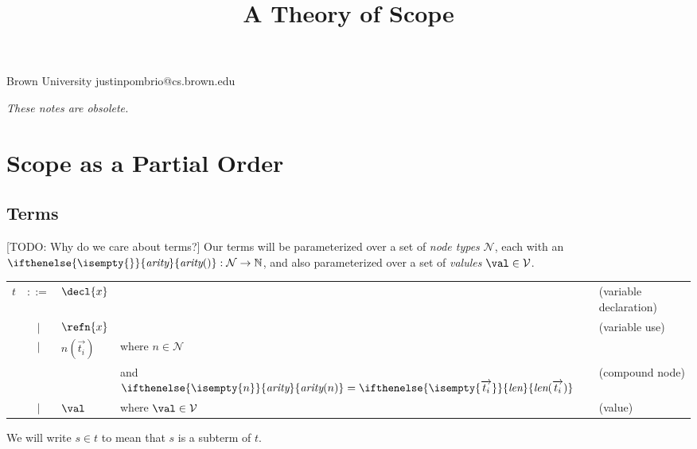 \documentclass[preprint]{sigplanconf}
\makeatletter
\newenvironment{jtable}
  {\begin{center}\begin{tabular}{l c l @{\quad}l l}}
  {\end{tabular}\end{center}}
\theoremstyle{plain}
\newcommand{\ifempty}[3]{\ifthenelse{\isempty{#1}}{#2}{#3}}
\newcommand{\constr}[2]{\ifempty{#2}{#1}{#1(#2)}}
\newcommand{\constrit}[2]{\constr{\textit{#1}}{#2}}
\newcommand{\node}[2]{#1(#2)}
\newcommand{\arity}[1]{\constrit{arity}{#1}}
\newcommand{\len}[1]{\constrit{len}{#1}}
\newcommand{\seq}[1]{\overrightarrow{#1}}
\makeatother
\begin{document}
\title{A Theory of Scope}
  {Brown University}
  {justinpombrio@cs.brown.edu}
\maketitle

\emph{These notes are obsolete.}



\section{Scope as a Partial Order}

\subsection{Terms}

[TODO: Why do we care about terms?]
Our terms will be parameterized over a set of \emph{node types}
$\mathcal{N}$, each with an
$\arity{} : \mathcal{N} \to \mathbb{N}$, and also parameterized over a
set of \emph{valules} $\val \in \mathcal{V}$.

\begin{jtable}
$t$ &$::=$& $\decl{x}$ && (variable declaration)\\
 &$\mid$& $\refn{x}$   && (variable use)\\
 &$\mid$& $\node{n}{\seq{t_i}}$
   &where $n \in \mathcal{N}$ \\
 &&&and $\arity{n} = \len{\seq{t_i}}$ &(compound node) \\
 &$\mid$& $\val$
   &where $\val \in \mathcal{V}$
   &(value)
\end{jtable}
We will write $s \in t$ to mean that $s$ is a subterm of $t$.
\end{document}
